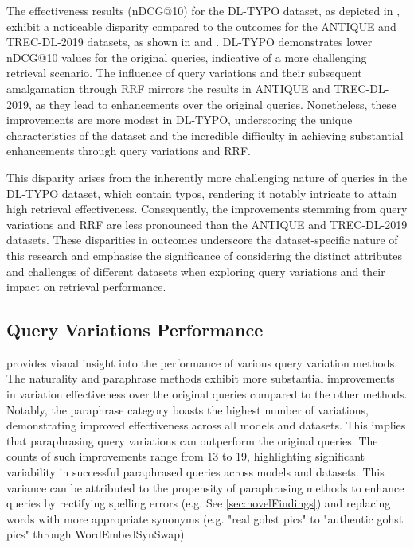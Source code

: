 The effectiveness results (nDCG@10) for the DL-TYPO dataset, as depicted in , exhibit a noticeable disparity compared to the outcomes for the ANTIQUE and TREC-DL-2019 datasets, as shown in  and . DL-TYPO demonstrates lower nDCG@10 values for the original queries, indicative of a more challenging retrieval scenario. The influence of query variations and their subsequent amalgamation through RRF mirrors the results in ANTIQUE and TREC-DL-2019, as they lead to enhancements over the original queries. Nonetheless, these improvements are more modest in DL-TYPO, underscoring the unique characteristics of the dataset and the incredible difficulty in achieving substantial enhancements through query variations and RRF.

This disparity arises from the inherently more challenging nature of queries in the DL-TYPO dataset, which contain typos, rendering it notably intricate to attain high retrieval effectiveness. Consequently, the improvements stemming from query variations and RRF are less pronounced than the ANTIQUE and TREC-DL-2019 datasets. These disparities in outcomes underscore the dataset-specific nature of this research and emphasise the significance of considering the distinct attributes and challenges of different datasets when exploring query variations and their impact on retrieval performance.

\subsection{Query Variations Performance}


 provides visual insight into the performance of various query variation methods. The naturality and paraphrase methods exhibit more substantial improvements in variation effectiveness over the original queries compared to the other methods. Notably, the paraphrase category boasts the highest number of variations, demonstrating improved effectiveness across all models and datasets. This implies that paraphrasing query variations can outperform the original queries. The counts of such improvements range from 13 to 19, highlighting significant variability in successful paraphrased queries across models and datasets. This variance can be attributed to the propensity of paraphrasing methods to enhance queries by rectifying spelling errors (e.g. See \ref{sec:novelFindings}) and replacing words with more appropriate synonyms (e.g. "real gohst pics" to "authentic gohst pics" through WordEmbedSynSwap).

